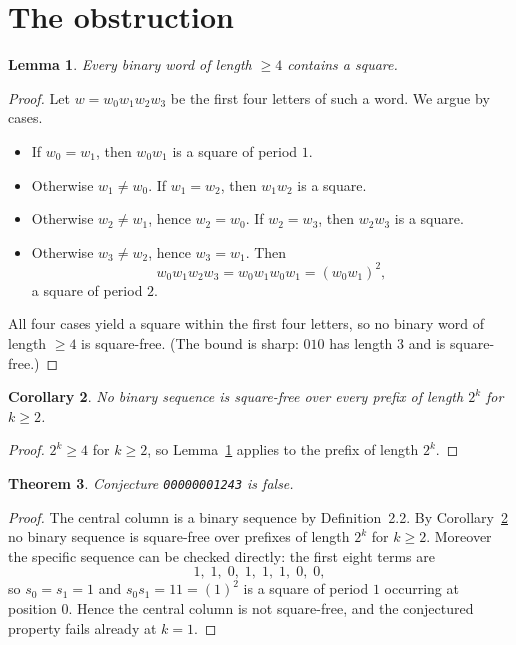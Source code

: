 \documentclass[11pt]{article}
\newtheorem{theorem}{Theorem}
\newtheorem{lemma}[theorem]{Lemma}
\newtheorem{corollary}[theorem]{Corollary}
\theoremstyle{definition}
\begin{document}
\section{The obstruction}

\begin{lemma}\label{lem:four}
Every binary word of length $\ge 4$ contains a square.
\end{lemma}

\begin{proof}
Let $w = w_0 w_1 w_2 w_3$ be the first four letters of such a word. We argue by
cases.

\begin{itemize}
\item If $w_0 = w_1$, then $w_0w_1$ is a square of period $1$.
\item Otherwise $w_1 \neq w_0$. If $w_1 = w_2$, then $w_1w_2$ is a square.
\item Otherwise $w_2 \neq w_1$, hence $w_2 = w_0$. If $w_2 = w_3$, then $w_2w_3$
      is a square.
\item Otherwise $w_3 \neq w_2$, hence $w_3 = w_1$. Then
      \[
      w_0w_1w_2w_3 = w_0w_1w_0w_1 = (w_0w_1)^2,
      \]
      a square of period $2$.
\end{itemize}

All four cases yield a square within the first four letters, so no binary word
of length $\ge 4$ is square-free. (The bound is sharp: $010$ has length $3$ and
is square-free.)
\end{proof}

\begin{corollary}\label{cor:all}
No binary sequence is square-free over every prefix of length $2^k$ for
$k \ge 2$.
\end{corollary}

\begin{proof}
$2^k \ge 4$ for $k \ge 2$, so Lemma~\ref{lem:four} applies to the prefix of
length $2^k$.
\end{proof}

\begin{theorem}
Conjecture \texttt{00000001243} is false.
\end{theorem}

\begin{proof}
The central column is a binary sequence by Definition~2.2. By
Corollary~\ref{cor:all} no binary sequence is square-free over prefixes of
length $2^k$ for $k \ge 2$. Moreover the specific sequence can be checked
directly: the first eight terms are
\[
1,\;1,\;0,\;1,\;1,\;1,\;0,\;0,
\]
so $s_0 = s_1 = 1$ and $s_0s_1 = 11 = (1)^2$ is a square of period $1$
occurring at position $0$. Hence the central column is not square-free, and the
conjectured property fails already at $k = 1$.
\end{proof}
\end{document}

